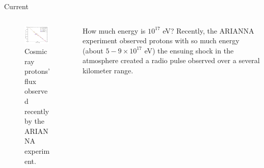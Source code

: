 \documentclass{beamer}
\begin{document}
\begin{frame}{Current}
\begin{columns}[T]
\begin{column}{0.5\textwidth}
\begin{figure}
\centering
\includegraphics[width=0.9\textwidth]{figures/ARIANNA1.png}
\caption{\label{fig:ARIANNA1} Cosmic ray protons' flux observed recently by the ARIANNA experiment.}
\end{figure}
\end{column}
\begin{column}{0.5\textwidth}
\small
How much energy is $10^{17}$ eV?  Recently, the ARIANNA experiment observed protons with so much energy (about $5-9 \times 10^{17}$ eV) the ensuing shock in the atmosphere created a radio pulse observed over a several kilometer range.
\end{column}
\end{columns}
\end{frame}
\end{document}
